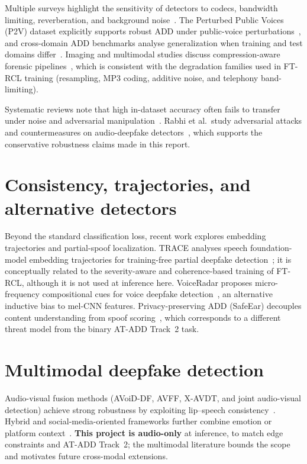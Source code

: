 Multiple surveys highlight the sensitivity of detectors to codecs, bandwidth limiting, reverberation, and background noise~\cite{zhang2025sensorsSurvey,alnaqbi2026systematic,nguyenle2026deepfakeSurvey}. The Perturbed Public Voices (P2V) dataset explicitly supports robust ADD under public-voice perturbations~\cite{gao2024p2v}, and cross-domain ADD benchmarks analyse generalization when training and test domains differ~\cite{li2024crossdomain}. Imaging and multimodal studies discuss compression-aware forensic pipelines~\cite{salvi2023compressionRobust}, which is consistent with the degradation families used in FT-RCL training (resampling, MP3 coding, additive noise, and telephony band-limiting).

Systematic reviews note that high in-dataset accuracy often fails to transfer under noise and adversarial manipulation~\cite{alnaqbi2026systematic,rabhi2024adversarial}. Rabhi et al.\ study adversarial attacks and countermeasures on audio-deepfake detectors~\cite{rabhi2024adversarial}, which supports the conservative robustness claims made in this report.

\section{Consistency, trajectories, and alternative detectors}

Beyond the standard classification loss, recent work explores embedding trajectories and partial-spoof localization. TRACE analyses speech foundation-model embedding trajectories for training-free partial deepfake detection~\cite{khan2026trace}; it is conceptually related to the severity-aware and coherence-based training of FT-RCL, although it is not used at inference here. VoiceRadar proposes micro-frequency compositional cues for voice deepfake detection~\cite{kumari2024voiceradar}, an alternative inductive bias to mel-CNN features. Privacy-preserving ADD (SafeEar) decouples content understanding from spoof scoring~\cite{li2023safear}, which corresponds to a different threat model from the binary AT-ADD Track~2 task.

\section{Multimodal deepfake detection}

Audio-visual fusion methods (AVoiD-DF, AVFF, X-AVDT, and joint audio-visual detection) achieve strong robustness by exploiting lip--speech consistency~\cite{yang2023avoiddf,oorloff2024avff,kim2026xavdt,zhou2019joint}. Hybrid and social-media-oriented frameworks further combine emotion or platform context~\cite{srikanth2023hybridEmotion,ugwumba2023multimodalFramework,hamed2023socialMediaReview}. \textbf{This project is audio-only} at inference, to match edge constraints and AT-ADD Track~2; the multimodal literature bounds the scope and motivates future cross-modal extensions.

